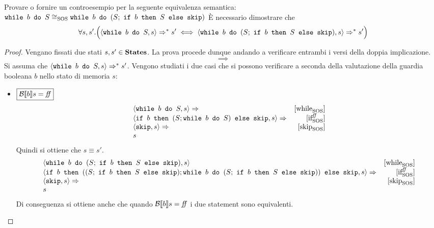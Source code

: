 {
  Provare o fornire un controesempio per la seguente equivalenza semantica: \\
  $\wbS{b}{S} \eqSOS{} \wbS{b}{(S;\ \ifABC{b}{S}{\skipForFriends})}$
}
{
È necessario dimostrare che
$$
\forall s,s'.
  \Big(\confSs{\wbS{b}{S}}{s} \Rar{*} s'
  \iff
  \confSs{\wbS{b}{(S;\ \ifABC{b}{S}{\skipForFriends})}}{s} \Rar{*} s' \Big)
$$
}
\begin{proof}
Vengano fissati due stati $s, s' \in \states$. La prova procede dunque andando
a verificare entrambi i versi della doppia implicazione.
$$
\boxed{\implies}
$$
Si assuma che $\confSs{\wbS{b}{S}}{s} \Rar{*} s'$. Vengono studiati i due casi
che si possono verificare a seconda della valutazione della guardia booleana $b$
nello stato di memoria $s$:
\begin{itemize}
  \item $\boxed{\B{b} = \semfalse}$
  $$
  \begin{array}{lr}
  \confSs{\wbS{b}{S}}{s} \Rar{ } & \whileSOS \\
  \confSs{\ifABC{b}{(S; \wbS{b}{S})}{\skipForFriends}}{s} \Rar{ }& \ifffSOS \\
  \confSs{\skipForFriends}{s} \Rar{} & \skipSOS\\
  s
  \end{array}
  $$
  Quindi si ottiene che $s \equiv{} s'$.
  $$
  \begin{array}{lr}
  \confSs{\wbS{b}{(S;\ \ifABC{b}{S}{\skipForFriends})}}{s} & \whileSOS \\
  \confSs{\ifABC{b}
            {((S;\ \ifABC{b}{S}{\skipForFriends});
              \wbS{b}{(S;\ \ifABC{b}{S}{\skipForFriends})})}
            {\skipForFriends}
         }{s} \Rar{ }& \ifffSOS \\
  \confSs{\skipForFriends}{s} \Rar{} & \skipSOS\\
  s
  \end{array}
  $$
  Di conseguenza si ottiene anche che quando $\B{b} = \semfalse$ i due
  statement sono equivalenti.


\end{itemize}
\end{proof}
